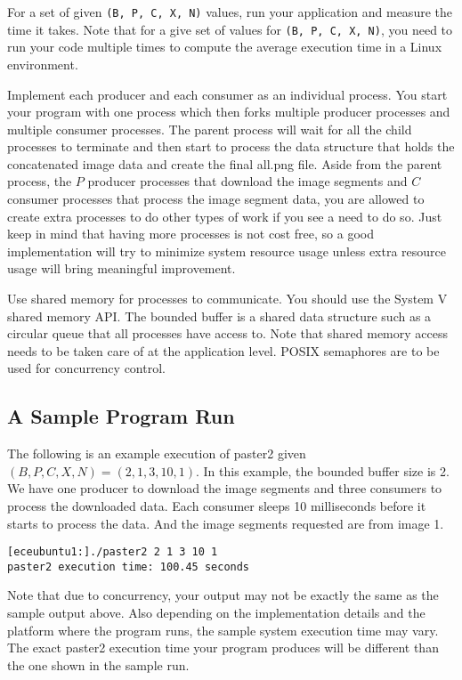 For a set of given \verb+(B, P, C, X, N)+ values, run your application and measure the time it takes. Note that for a give set of values for \verb+(B, P, C, X, N)+, you need to run your code multiple times to compute the average execution time in a Linux environment.

Implement each producer and each consumer as an individual process. You start your program with one process which then forks multiple producer processes and multiple consumer processes. The parent process will wait for all the child processes to terminate and then start to process the data structure that holds the concatenated image data and create the final all.png file. Aside from the parent process, the $P$ producer processes that download the image segments and $C$ consumer processes that process the image segment data, you are allowed to create extra processes to do other types of work if you see a need to do so. Just keep in mind that having more processes is not cost free, so a good implementation will try to minimize system resource usage unless extra resource usage will bring meaningful improvement.


Use shared memory for processes to communicate. You should use the System V %
shared memory API. The bounded buffer is a shared data structure such as a circular queue that all processes have access to. Note that shared memory access needs to be taken care of at the application level. POSIX semaphores are to be used for concurrency control.

\subsection*{A Sample Program Run}
The following is an example execution of paster2 given $(B, P, C, X, N) = (2, 1, 3, 10, 1)$. In this example, the bounded buffer size is 2. We have one producer to download the image segments and three  consumers to process the downloaded data. Each consumer sleeps 10 milliseconds before it starts to process the data. And the image segments requested are from image 1.
\begin{verbatim}
[eceubuntu1:]./paster2 2 1 3 10 1
paster2 execution time: 100.45 seconds
\end{verbatim}
Note that due to concurrency, your output may not be exactly the same as the sample output above. Also depending on the implementation details and the platform where the program runs, the sample system execution time may vary. The exact paster2 execution time your program produces will be different than the one shown in the sample run.

